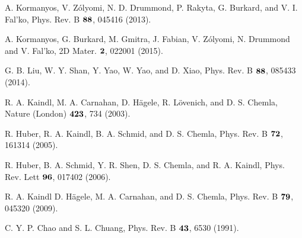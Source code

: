 \documentclass[prb,twocolumn,amsmath,amssymb,superscriptaddress,showpacs]{revtex4}
\begin{document}
\begin{thebibliography}{99}
A. Kormanyos, V. Z\'olyomi, N. D. Drummond, P. Rakyta, G. Burkard, and V. I. Fal'ko, Phys. Rev. B $\bf 88$, 045416 (2013).

A. Kormanyos, G. Burkard, M. Gmitra, J. Fabian, V. Z\'olyomi, N. Drummond and V. Fal'ko, 2D Mater. $\bf2$, 022001 (2015).

G. B. Liu, W. Y. Shan, Y. Yao, W. Yao, and D. Xiao, Phys. Rev. B $\bf 88$, 085433 (2014).

R. A. Kaindl, M. A. Carnahan, D. H\"agele, R. L\"ovenich, and D. S. Chemla, Nature (London) $\bf423$, 734 (2003).

R. Huber, R. A. Kaindl, B. A. Schmid, and D. S. Chemla, Phys. Rev. B $\bf 72$, 161314 (2005).

R. Huber, B. A. Schmid, Y. R. Shen, D. S. Chemla, and R. A. Kaindl, Phys. Rev. Lett $\bf 96$, 017402 (2006).

R. A. Kaindl D. H\"agele, M. A. Carnahan, and D. S. Chemla, Phys. Rev. B $\bf 79$, 045320 (2009).

C. Y. P. Chao and S. L. Chuang, Phys. Rev. B $\bf 43$, 6530 (1991).




\end{thebibliography}
\end{document}
